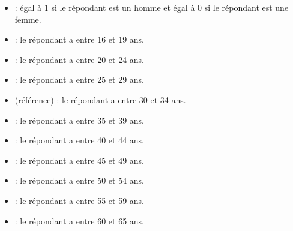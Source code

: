 \documentclass[letterpaper,10pt,french]{sphinxmanual}
\begin{document}

\begin{itemize}
\item {} 
 : égal à 1 si le répondant est un homme et égal à 0 si le répondant est une femme.

\end{itemize}

\begin{itemize}
\item {} 
 : le répondant a entre 16 et 19 ans.

\item {} 
 : le répondant a entre 20 et 24 ans.

\item {} 
 : le répondant a entre 25 et 29 ans.

\item {} 
 (référence) : le répondant a entre 30 et 34 ans.

\item {} 
 : le répondant a entre 35 et 39 ans.

\item {} 
 : le répondant a entre 40 et 44 ans.

\item {} 
 : le répondant a entre 45 et 49 ans.

\item {} 
 : le répondant a entre 50 et 54 ans.

\item {} 
 : le répondant a entre 55 et 59 ans.

\item {} 
 : le répondant a entre 60 et 65 ans.

\end{itemize}
\end{document}
